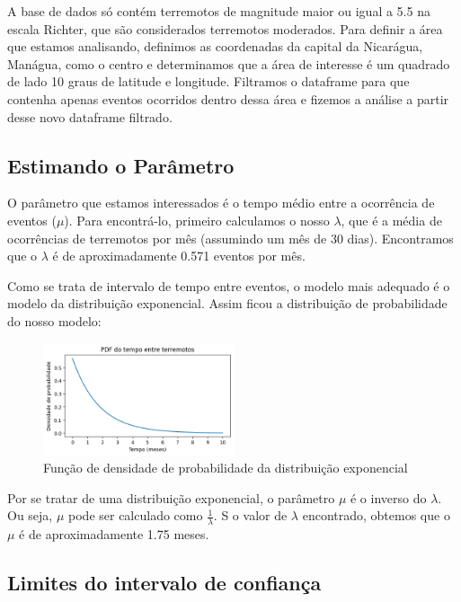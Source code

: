 \documentclass{article}
\begin{document}
    A base de dados só contém terremotos de magnitude maior ou igual a 5.5 na escala Richter, que são considerados terremotos moderados.
    Para definir a área que estamos analisando, definimos as coordenadas da capital da Nicarágua, Manágua, como o centro e determinamos que
    a área de interesse é um quadrado de lado 10 graus de latitude e longitude. Filtramos o dataframe para que contenha apenas eventos
    ocorridos dentro dessa área e fizemos a análise a partir desse novo dataframe filtrado.\\

    \subsection*{Estimando o Parâmetro}

    O parâmetro que estamos interessados é o tempo médio entre a ocorrência de eventos ($\mu$). Para encontrá-lo, primeiro
    calculamos o nosso $\lambda$, que é a média de ocorrências de terremotos por mês (assumindo um mês de 30 dias). Encontramos
    que o $\lambda$ é de aproximadamente 0.571 eventos por mês.

    Como se trata de intervalo de tempo entre eventos, o modelo mais adequado é o modelo da distribuição exponencial. Assim
    ficou a distribuição de probabilidade do nosso modelo:\\

    \begin{figure}[h]
        \centering
        \includegraphics[width=0.5\textwidth]{pdf_expon_terremotos.png}
        \caption{Função de densidade de probabilidade da distribuição exponencial}
    \end{figure}


    Por se tratar de uma distribuição exponencial, o parâmetro $\mu$ é o inverso do $\lambda$. Ou seja, $\mu$ pode ser calculado 
    como $\frac{1}{\lambda}$. S o valor de $\lambda$ encontrado, obtemos que o $\mu$ 
    é de aproximadamente 1.75 meses.\\


    \subsection*{Limites do intervalo de confiança}
    
\end{document}
